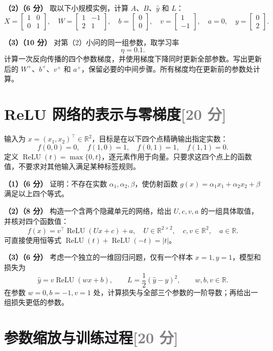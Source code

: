\documentclass[11pt,a4paper]{article}
\newcommand{\R}{\mathbb R}
\newcommand{\relu}{\operatorname{ReLU}}
\newcommand{\partq}[2]{\par\Needspace{5\baselineskip}\noindent\textbf{（#1）（#2 分）}}
\begin{document}
\partq{2}{6} 取以下小规模实例，计算 $A$、$B$、$\widehat y$ 和 $L$：
\[
X=\begin{bmatrix}1&0\\0&1\end{bmatrix},\quad
W=\begin{bmatrix}1&-1\\2&1\end{bmatrix},\quad
b=\begin{bmatrix}0\\0\end{bmatrix},\quad
v=\begin{bmatrix}1\\-1\end{bmatrix},\quad a=0,\quad
y=\begin{bmatrix}0\\2\end{bmatrix}.
\]
\partq{3}{10} 对第（2）小问的同一组参数，取学习率
\[
\eta=0.1.
\]
计算一次反向传播的四个参数梯度，并使用梯度下降同时更新全部参数。写出更新后的 $W^+$、$b^+$、$v^+$ 和 $a^+$，保留必要的中间步骤。所有梯度均在更新前的参数处计算。

\clearpage
\section[ReLU 网络的表示与零梯度]{ReLU 网络的表示与零梯度\hfill\textcolor{gray}{[20 分]}}

输入为 $x=(x_1,x_2)^\top\in\R^2$，目标是在以下四个点精确输出指定实数：
\[
f(0,0)=0,\quad f(1,0)=1,\quad f(0,1)=1,\quad f(1,1)=0.
\]
定义 $\relu(t)=\max\{0,t\}$，逐元素作用于向量。只要求这四个点上的函数值，不要求对其他输入满足某种标签规则。

\partq{1}{6} 证明：不存在实数 $\alpha_1,\alpha_2,\beta$，使仿射函数 $g(x)=\alpha_1x_1+\alpha_2x_2+\beta$ 满足以上四个等式。

\partq{2}{8} 构造一个含两个隐藏单元的网络，给出 $U,c,v,a$ 的一组具体取值，并核对四个函数值：
\[
f(x)=v^\top\relu(Ux+c)+a,\quad
U\in\R^{2\times2},\quad c,v\in\R^2,\quad a\in\R.
\]
可直接使用恒等式 $\relu(t)+\relu(-t)=|t|$。

\partq{3}{6} 考虑一个独立的一维回归问题，仅有一个样本 $x=1,y=1$，模型和损失为
\[
\widehat y=v\relu(wx+b),\qquad L=\frac12(\widehat y-y)^2,
\qquad w,b,v\in\R.
\]
在参数 $w=0,b=-1,v=1$ 处，计算损失与全部三个参数的一阶导数；再给出一组损失更低的参数。

\clearpage
\section[参数缩放与训练过程]{参数缩放与训练过程\hfill\textcolor{gray}{[20 分]}}
\end{document}
